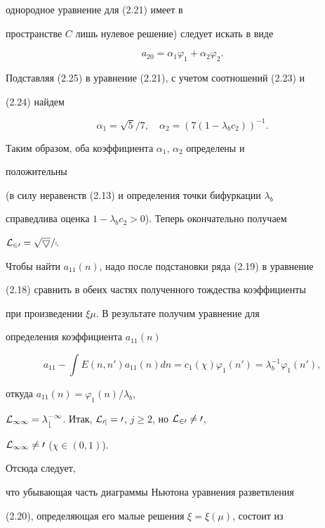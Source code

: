 однородное уравнение для (2.21) имеет в  


пространстве $C$ лишь нулевое решение) следует искать в виде 


\begin{equation} 


a_{20}=\alpha_1\varphi_1+\alpha_2\varphi_2.\tag{2.25} 


\end{equation} 


Подставляя (2.25) в уравнение (2.21), с учетом соотношений (2.23) и  


(2.24) найдем 


$$ 


\alpha_1=\sqrt{5}/7,\quad \alpha_2=(7(1-\lambda_b c_2))^{-1}. 


$$ 


Таким образом, оба коэффициента $\alpha_1$, $\alpha_2$ определены и 


положительны  


(в силу неравенств (2.13) и определения точки бифуркации $\lambda_b$ 


справедлива оценка $1-\lambda_b c_2>0$). Теперь окончательно получаем 


$\cal L_{20}=\sqrt{5}/7$. 


 


Чтобы найти $a_{11}(n)$, надо после подстановки ряда (2.19) в уравнение 


(2.18) сравнить в обеих частях полученного тождества коэффициенты 


при произведении $\xi\mu$. В результате получим уравнение для  


определения коэффициента $a_{11}(n)$ 


$$ 


a_{11}-\int E(n,n')a_{11}(n)dn=c_1(\chi)\varphi_1(n')= 


\lambda^{-1}_b\varphi_1(n'), 


$$ 


откуда $a_{11}(n)=\varphi_1(n)/\lambda_b$, 


$\cal L_{11}=\lambda^{-1}_b$. Итак, $\cal L_{0j}=0$, $j\ge 2$, но $\cal 


L_{20}\ne 0$, 


$\cal L_{11}\ne0$ ($\chi\in(0,1)$). 


Отсюда следует,  


что убывающая часть диаграммы Ньютона уравнения разветвления  


(2.20), определяющая его малые решения $\xi=\xi(\mu)$, состоит из 


